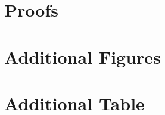 \begin{appendices}

\chapter{Proofs}


\chapter{Additional Figures}

\chapter{Additional Table}


\end{appendices}